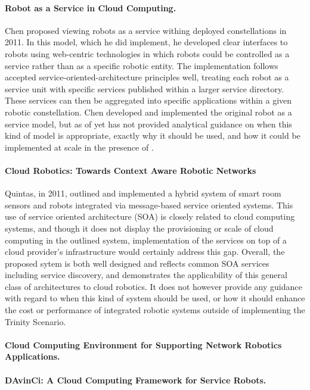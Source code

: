 \documentclass[10pt,letterpaper]{article}
\begin{document}
\paragraph{Robot as a Service in Cloud Computing.}
Chen proposed viewing robots as a service withing deployed constellations in 2011.  In this model, which he did implement, he developed clear interfaces to robots using web-centric technologies in which robots could be controlled as a service rather than as a specific robotic entity. The implementation follows accepted service-oriented-architecture principles well, treating each robot as a service unit with specific services published within a larger service directory.  These services can then be aggregated into specific applications within a given robotic constellation.  Chen developed and implemented the original robot as a service model, but as of yet has not provided analytical guidance on when this kind of model is appropriate, exactly why it should be used, and how it could be implemented at scale in the presence of  \cite{YiZhGa:10}.

\paragraph{Cloud Robotics: Towards Context Aware Robotic Networks}
Quintas, in 2011, outlined and implemented a hybrid system of smart room sensors and robots integrated via message-based service oriented systems.  This use of service oriented architecture (SOA) is closely related to cloud computing systems, and though it does not display the provisioning or scale of cloud computing in the outlined system, implementation of the services on top of a cloud provider's infrastructure would certainly address this gap.  Overall, the proposed sytem is both well designed and reflects common SOA services including service discovery, and demonstrates the applicability of this general class of architectures to cloud robotics.  It does not however provide any guidance with regard to when this kind of system should be used, or how it should enhance the cost or performance of integrated robotic systems outside of implementing the Trinity Scenario.

\cite{QuMeDi:11}

\paragraph{Cloud Computing Environment for Supporting Network Robotics Applications.}

\cite{AgOlFePa:11}

\paragraph{DAvinCi: A Cloud Computing Framework for Service Robots.}

\cite{ArEnLiWu:10}



\end{document}
